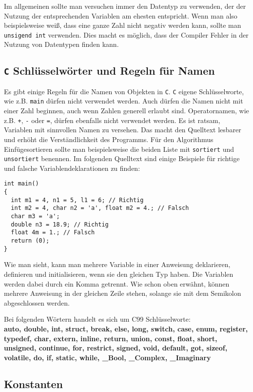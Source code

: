 Im allgemeinen sollte man versuchen immer den Datentyp zu verwenden, der der Nutzung der entsprechenden Variablen am ehesten entspricht.
Wenn man also beispielsweise weiß, dass eine ganze Zahl nicht negativ werden kann, sollte man \texttt{unsigend int} verwenden.
Dies macht es möglich, dass der Compiler Fehler in der Nutzung von Datentypen finden kann.

\subsection{\texttt{C} Schlüsselwörter und Regeln für Namen}

Es gibt einige Regeln für die Namen von Objekten in \texttt{C}. 
\texttt{C} eigene Schlüsselworte, wie z.B. \texttt{main} dürfen nicht verwendet werden.
Auch dürfen die Namen nicht mit einer Zahl beginnen, auch wenn Zahlen generell erlaubt sind.
Operatornamen, wie z.B. \verb|+|, \verb|-| oder \verb|=|, dürfen ebenfalls nicht verwendet werden.
Es ist ratsam, Variablen mit sinnvollen Namen zu versehen.
Das macht den Quelltext lesbarer und erhöht die Verständlichkeit des Programms.
Für den Algorithmus Einfügesortieren sollte man beispielsweise die beiden Liste mit \texttt{sortiert} und \texttt{unsortiert} benennen.
Im folgenden Quelltext sind einige Beispiele für richtige und falsche Variablendeklarationen zu finden:
\begin{lstlisting}
int main()
{
  int m1 = 4, n1 = 5, l1 = 6; // Richtig
  int m2 = 4, char n2 = 'a', float m2 = 4.; // Falsch
  char m3 = 'a';
  double n3 = 18.9; // Richtig
  float 4m = 1.; // Falsch
  return (0);
}
\end{lstlisting} 
Wie man sieht, kann man mehrere Variable in einer Anweisung deklarieren, definieren und initialisieren, wenn sie den gleichen Typ haben.
Die Variablen werden dabei durch ein Komma getrennt.
Wie schon oben erwähnt, können mehrere Anweisung in der gleichen Zeile stehen, solange sie mit dem Semikolon abgeschlossen werden.

Bei folgenden Wörtern handelt es sich um C99 Schlüsselworte:\\
\textbf{auto, double, int, struct, break, else, long, switch, case,
  enum, register, typedef, char, extern, inline, return, union, const, float,
  short, unsigned, continue, for, restrict, signed, void, default, got, sizeof,
  volatile, do, if, static, while, \_Bool, \_Complex, \_Imaginary}

\subsection{Konstanten}

